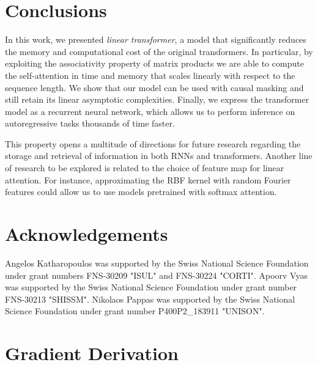 \documentclass{article}
\newcommand{\linear}{\emph{linear transformer}}
\begin{document}
\section{Conclusions}

In this work, we presented \linear{}, a model that significantly
reduces the memory and computational cost of the original transformers. In
particular, by exploiting the associativity property of matrix products we are
able to compute the self-attention in time and memory that scales linearly with
respect to the sequence length. We show that our model can be used with causal
masking and still retain its linear asymptotic complexities. Finally, we
express the transformer model as a recurrent neural network, which allows us to
perform inference on autoregressive tasks thousands of time faster.

This property opens a multitude of directions for future research regarding the
storage and retrieval of information in both RNNs and transformers. Another
line of research to be explored is related to the choice of feature map for
linear attention. For instance, approximating the RBF kernel with random
Fourier features could allow us to use models pretrained with softmax
attention.

\section*{Acknowledgements}

Angelos Katharopoulos was supported by the Swiss National Science Foundation
under grant numbers FNS-30209 "ISUL" and FNS-30224 "CORTI". Apoorv Vyas was
supported by the Swiss National Science Foundation under grant number FNS-30213
"SHISSM". Nikolaos Pappas was supported by the Swiss National Science
Foundation under grant number P400P2\_183911 "UNISON".




\appendix
\onecolumn
{}
\section{Gradient Derivation}
\end{document}
